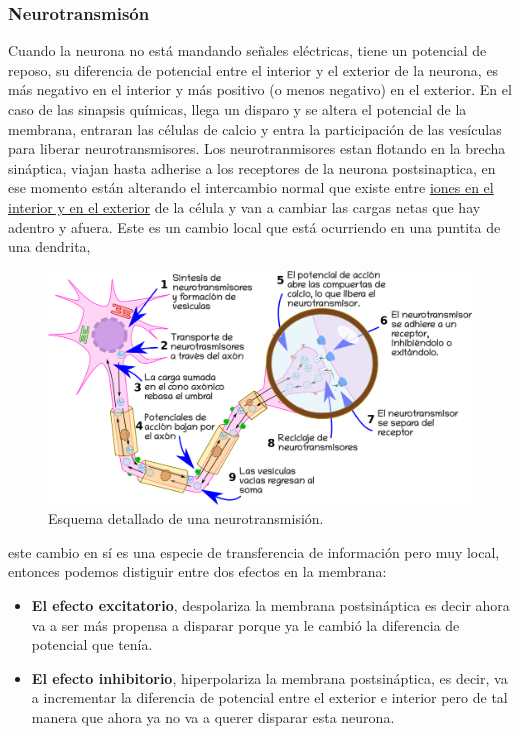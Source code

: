 \subsubsection{Neurotransmisón}
Cuando la neurona no está mandando señales eléctricas, tiene un potencial de reposo, su diferencia de potencial entre el interior y el exterior de la neurona, es más negativo en el interior y más positivo (o menos negativo) en el exterior.
En el caso de las sinapsis químicas, llega un disparo y se altera el potencial de la membrana, entraran las
células de calcio y entra la participación de las vesículas para liberar neurotransmisores. Los neurotranmisores estan flotando en la brecha sináptica, viajan hasta adherise a los receptores de la neurona postsinaptica, en ese momento están alterando el intercambio normal que existe entre \underline{iones en el interior y en el exterior} de la célula y van a cambiar las cargas netas que hay adentro y afuera. Este es un cambio local que está ocurriendo en una puntita de una dendrita, 

\begin{figure}[h]
 \centering
 \includegraphics[scale=0.2]{../Figuras/neurotransmision.png} 
 \caption{Esquema detallado de una neurotransmisión.}
 \label{fig:nTransmision}
\end{figure}

este cambio en sí es una especie de transferencia de información pero muy local, entonces podemos distiguir entre dos efectos en la membrana: 

\begin{itemize}
\item \textbf{El efecto excitatorio}, despolariza la membrana postsináptica es decir ahora va a ser más propensa a disparar porque ya le cambió la diferencia de potencial que tenía.  
\item \textbf{El efecto inhibitorio}, hiperpolariza la membrana postsináptica, es decir, va a incrementar la diferencia de potencial entre el exterior e interior pero de tal manera que ahora ya no va a querer disparar esta neurona.
\end{itemize}

